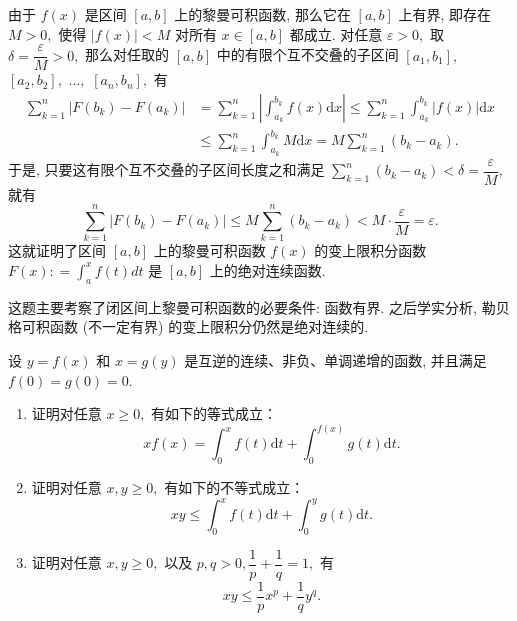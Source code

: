 \begin{solution}
  由于 $f(x)$ 是区间 $[a, b]$ 上的黎曼可积函数, 那么它在 $[a, b]$ 上有界, 即存在 $M > 0,$ 使得 $\lvert f(x) \rvert < M$ 对所有 $x \in [a, b]$ 都成立. 对任意 $\varepsilon > 0,$ 取 $\delta = \dfrac{\varepsilon}{M} > 0,$ 那么对任取的 $[a, b]$ 中的有限个互不交叠的子区间 $[a_1, b_1],$ $[a_2, b_2],$ $\dots,$ $[a_n, b_n],$ 有
  \begin{align*}
    \sum\limits_{k=1}^n \lvert F(b_k) - F(a_k) \rvert & = \sum\limits_{k=1}^n \left\lvert \int_{a_k}^{b_k} f(x) \mathrm{d}x \right\rvert \leqslant \sum\limits_{k=1}^n \int_{a_k}^{b_k} \lvert f(x) \rvert \mathrm{d}x \\
    & \leqslant \sum\limits_{k=1}^n \int_{a_k}^{b_k} M \mathrm{d}x = M \sum\limits_{k=1}^n (b_k - a_k).
  \end{align*}
  于是, 只要这有限个互不交叠的子区间长度之和满足 $\sum\limits_{k=1}^n (b_k - a_k) < \delta = \dfrac{\varepsilon}{M},$ 就有
  $$\sum\limits_{k=1}^n \lvert F(b_k) - F(a_k) \rvert \leqslant M \sum\limits_{k=1}^n (b_k - a_k) < M \cdot \dfrac{\varepsilon}{M} = \varepsilon.$$
  这就证明了区间 $[a, b]$ 上的黎曼可积函数 $f(x)$ 的变上限积分函数$F(x) : = \int_{a}^{x} f(t) dt$ 是 $[a, b]$ 上的绝对连续函数.

  这题主要考察了闭区间上黎曼可积函数的必要条件: 函数有界. 之后学实分析, 勒贝格可积函数 (不一定有界) 的变上限积分仍然是绝对连续的.
\end{solution}

\begin{question}[points = 10]
  设 $y = f(x)$ 和 $x = g(y)$ 是互逆的连续、非负、单调递增的函数, 并且满足 $f(0) = g(0) = 0.$
  \begin{enumerate}
    \item 证明对任意 $x \geqslant 0,$ 有如下的等式成立：
    $$xf(x) = \int_0^x f(t) \mathrm{d}t + \int_0^{f(x)} g(t) \mathrm{d}t.$$
    \item 证明对任意 $x, y \geqslant 0,$ 有如下的不等式成立：
    $$xy \leqslant \int_0^x f(t) \mathrm{d}t + \int_0^y g(t) \mathrm{d}t.$$
    \item 证明对任意 $x, y \geqslant 0,$ 以及 $p, q > 0, \dfrac{1}{p} + \dfrac{1}{q} = 1,$ 有
    $$xy \leqslant \dfrac{1}{p} x^p + \dfrac{1}{q} y^q.$$
  \end{enumerate}

\end{question}

